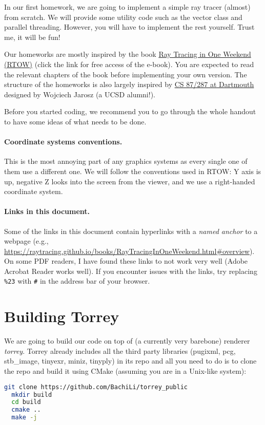 



\setcounter{section}{-1}

In our first homework, we are going to implement a simple ray tracer (almost) from scratch.
We will provide some utility code such as the vector class and parallel threading. 
However, you will have to implement the rest yourself. Trust me, it will be fun!

Our homeworks are mostly inspired by the book \href{https://raytracing.github.io/}{Ray Tracing in One Weekend (RTOW)} (click the link for free access of the e-book). You are expected to read the relevant chapters of the book before implementing your own version. The structure of the homeworks is also largely inspired by \href{https://cs87-dartmouth.github.io/Fall2022/assignments.html}{CS 87/287 at Dartmouth} designed by Wojciech Jarosz (a UCSD alumni!).

Before you started coding, we recommend you to go through the whole handout to have some ideas of what needs to be done.

\paragraph{Coordinate systems conventions.} This is the most annoying part of any graphics systems as every single one of them use a different one. We will follow the conventions used in RTOW: Y axis is up, negative Z looks into the screen from the viewer, and we use a right-handed coordinate system.

\paragraph{Links in this document.} Some of the links in this document contain hyperlinks with a \emph{named anchor} to a webpage (e.g., \url{https://raytracing.github.io/books/RayTracingInOneWeekend.html\#overview}). On some PDF readers, I have found these links to not work very well (Adobe Acrobat Reader works well). If you encounter issues with the links, try replacing \lstinline{%23} with \lstinline{#} in the address bar of your browser.

\section{Building Torrey}
We are going to build our code on top of (a currently very barebone) renderer \emph{torrey}. Torrey already includes all the third party libraries (pugixml, pcg, stb\_image, tinyexr, miniz, tinyply) in its repo and all you need to do is to clone the repo and build it using CMake (assuming you are in a Unix-like system):
\begin{lstlisting}[language=bash]
  git clone https://github.com/BachiLi/torrey_public
  mkdir build
  cd build
  cmake ..
  make -j
\end{lstlisting}

